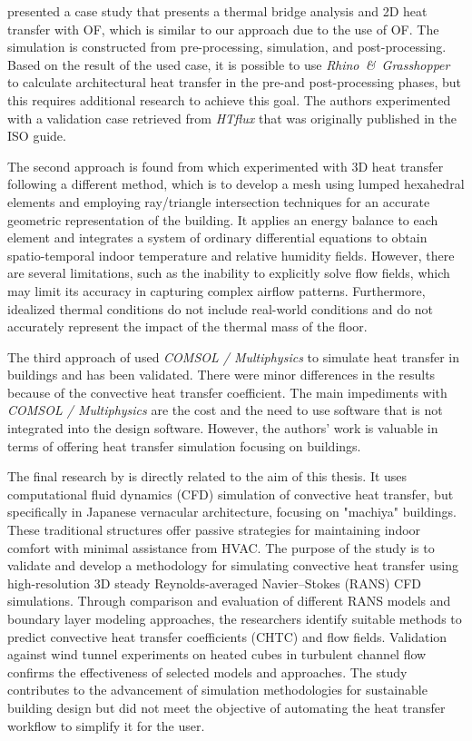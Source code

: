 \citeauthor{kastner2020solving} \cite{kastner2020solving} presented a case study that presents a thermal bridge analysis and 2D heat transfer with \gls{OF}, which is similar to our approach due to the use of \gls{OF}. The simulation is constructed from pre-processing, simulation, and post-processing. 
Based on the result of the used case, it is possible to use \textit{Rhino\ \&\ Grasshopper} to calculate architectural heat transfer in the pre-and post-processing phases, but this requires additional research to achieve this goal. 
The authors experimented with a validation case retrieved from \textit{HTflux} that was originally published in the ISO guide. 

The second approach is found from \citeauthor{Yang} \cite{Yang} which experimented with 3D heat transfer following a different method, which is to develop a mesh using lumped hexahedral elements and employing ray/triangle intersection techniques for an accurate geometric representation of the building. 
It applies an energy balance to each element and integrates a system of ordinary differential equations to obtain spatio-temporal indoor temperature and relative humidity fields. 
However, there are several limitations, such as the inability to explicitly solve flow fields, which may limit its accuracy in capturing complex airflow patterns. 
Furthermore, idealized thermal conditions do not include real-world conditions and do not accurately represent the impact of the thermal mass of the floor. 


The third approach of \citeauthor{COMSOL} \cite{COMSOL} used \textit{COMSOL / Multiphysics} to simulate heat transfer in buildings and has been validated. There were minor differences in the results because of the convective heat transfer coefficient. 
The main impediments with \textit{COMSOL / Multiphysics} are the cost and the need to use software that is not integrated into the design software.
However, the authors' work is valuable in terms of offering heat transfer simulation focusing on buildings.  %

The final research by \citeauthor{litrev2} \cite{litrev2} is directly related to the aim of this thesis. 
It uses computational fluid dynamics (CFD) simulation of convective heat transfer, but specifically in Japanese vernacular architecture, focusing on "machiya" buildings. These traditional structures offer passive strategies for maintaining indoor comfort with minimal assistance from HVAC. The purpose of the study is to validate and develop a methodology for simulating convective heat transfer using high-resolution 3D steady Reynolds-averaged Navier–Stokes (RANS) CFD simulations. Through comparison and evaluation of different \gls{RANS} models and boundary layer modeling approaches, the researchers identify suitable methods to predict convective heat transfer coefficients (\gls{CHTC}) and flow fields. Validation against wind tunnel experiments on heated cubes in turbulent channel flow confirms the effectiveness of selected models and approaches. The study contributes to the advancement of simulation methodologies for sustainable building design but did not meet the objective of automating the heat transfer workflow to simplify it for the user. 



